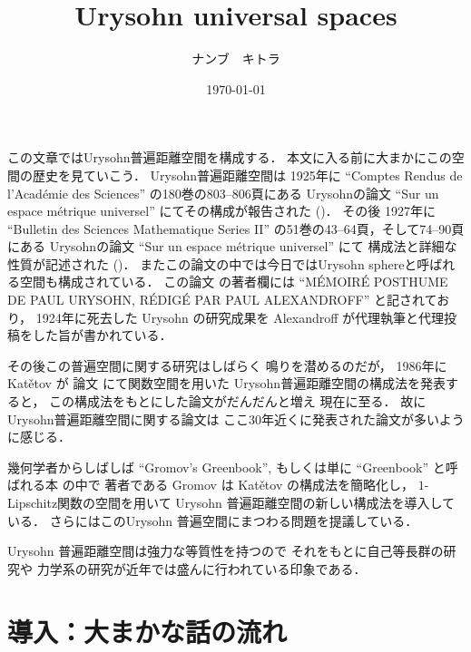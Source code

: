 \documentclass[leqno, 12pt]{jsarticle}
\title{Urysohn universal spaces}
\author{ナンブ　キトラ}
\date{\today}
\begin{document}
\maketitle

\newpage 
この文章ではUrysohn普遍距離空間を構成する．
本文に入る前に大まかにこの空間の歴史を見ていこう．
Urysohn普遍距離空間は
1925年に
``Comptes Rendus de l'Acad\'{e}mie des Sciences''
の180巻の803--806頁にある
Urysohnの論文
``Sur un espace m\'etrique universel''
にてその構成が報告された (\cite{Ury1})．
その後
1927年に
``Bulletin des Sciences Mathematique Series II''
の51巻の43--64頁，そして74--90頁にある
Urysohnの論文
``Sur un espace m\'etrique universel''
にて
構成法と詳細な性質が記述された 
(\cite{Ury2})．
またこの論文の中では今日ではUrysohn sphereと呼ばれる空間も構成されている．
この論文
\cite{Ury2}
の著者欄には
``M\'{E}MOIR\'{E} POSTHUME DE PAUL URYSOHN, 
R\'{E}DIG\'{E} PAR PAUL ALEXANDROFF''
と記されており，
1924年に死去した
Urysohn
の研究成果を
Alexandroff
が代理執筆と代理投稿をした旨が書かれている．



その後この普遍空間に関する研究はしばらく
鳴りを潜めるのだが，
1986年に
Kat\v{e}tov
が
論文
\cite{Ka}
にて関数空間を用いた
Urysohn普遍距離空間の構成法を発表すると，
この構成法をもとにした論文がだんだんと増え
現在に至る．
故にUrysohn普遍距離空間に関する論文は
ここ30年近くに発表された論文が多いように感じる．

幾何学者からしばしば
``Gromov's Greenbook'', 
もしくは単に
``Greenbook''
と呼ばれる本 
\cite{Greenbook}
の中で
著者である
Gromov
は
Kat\v{e}tov
の構成法を簡略化し，
$1$-Lipschitz関数の空間を用いて
Urysohn
普遍距離空間の新しい構成法を導入している．
さらにはこのUrysohn
普遍空間にまつわる問題を提議している．



Urysohn
普遍距離空間は強力な等質性を持つので
それをもとに自己等長群の研究や
力学系の研究が近年では盛んに行われている印象である．


\newpage 
\tableofcontents




\newpage 
\section{導入：大まかな話の流れ}\label{sec:intro1}
\end{document}
